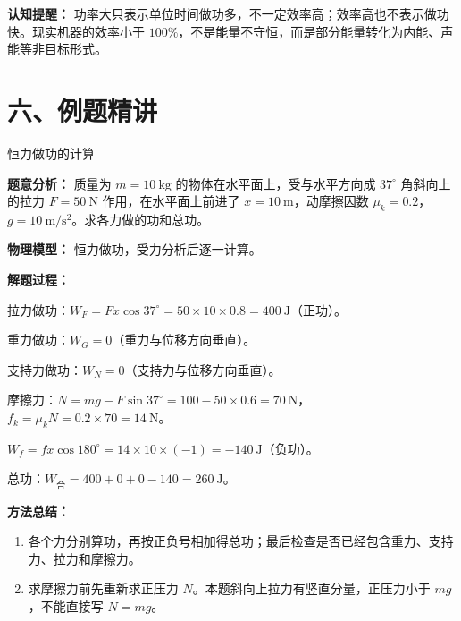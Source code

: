 \begin{center}


\label{fig:mechanical-efficiency}
\end{center}

\textbf{认知提醒：} 功率大只表示单位时间做功多，不一定效率高；效率高也不表示做功快。现实机器的效率小于 $100\%$，不是能量不守恒，而是部分能量转化为内能、声能等非目标形式。

\section*{六、例题精讲}

\begin{examplebox}{恒力做功的计算}

\textbf{题意分析：} 质量为 $m = 10\ \mathrm{kg}$ 的物体在水平面上，受与水平方向成 $37^\circ$ 角斜向上的拉力 $F = 50\ \mathrm{N}$ 作用，在水平面上前进了 $x = 10\ \mathrm{m}$，动摩擦因数 $\mu_k = 0.2$，$g = 10\ \mathrm{m/s^2}$。求各力做的功和总功。

\textbf{物理模型：} 恒力做功，受力分析后逐一计算。

\begin{center}


\label{fig:example-work-incline-pull}
\end{center}

\textbf{解题过程：}

拉力做功：$W_F = Fx\cos 37^\circ = 50 \times 10 \times 0.8 = 400\ \mathrm{J}$（正功）。

重力做功：$W_G = 0$（重力与位移方向垂直）。

支持力做功：$W_N = 0$（支持力与位移方向垂直）。

摩擦力：$N = mg - F\sin 37^\circ = 100 - 50 \times 0.6 = 70\ \mathrm{N}$，$f_k = \mu_k N = 0.2 \times 70 = 14\ \mathrm{N}$。

$W_f = f x \cos 180^\circ = 14 \times 10 \times (-1) = -140\ \mathrm{J}$（负功）。

总功：$W_{\text{合}} = 400 + 0 + 0 - 140 = 260\ \mathrm{J}$。

\textbf{方法总结：}
\begin{enumerate}
  \item 各个力分别算功，再按正负号相加得总功；最后检查是否已经包含重力、支持力、拉力和摩擦力。
  \item 求摩擦力前先重新求正压力 $N$。本题斜向上拉力有竖直分量，正压力小于 $mg$，不能直接写 $N=mg$。
\end{enumerate}

\end{examplebox}

